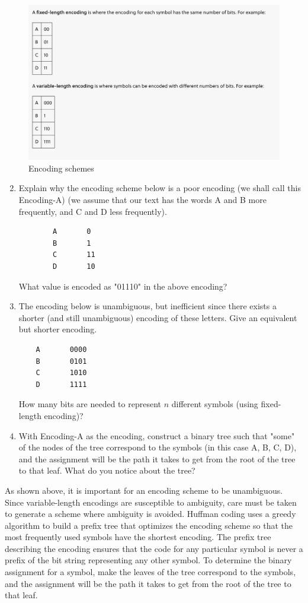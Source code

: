 \documentclass[11pt]{article}
\begin{document}
\begin{figure}[h!]
	\centering
	\label{fig:encoding-1}
	\includegraphics[scale=0.5]{encoding-1.png}
	\caption{Encoding schemes}
\end{figure}

\begin{enumerate}\setcounter{enumi}{1}
	\item Explain why the encoding scheme below is a poor encoding (we shall call this Encoding-A) (we assume that our text has the words A and B more frequently, and C and D less frequently).
	\begin{verbatim}
		A		0
		B		1
		C		11
		D		10
	\end{verbatim}
What value is encoded as "01110" in the above encoding?

\item The encoding below is unambiguous, but inefficient since there exists a shorter (and still unambiguous) encoding of these letters. Give an equivalent but shorter encoding.

	\begin{verbatim}
	A		0000			
	B		0101
	C		1010
	D		1111
\end{verbatim}
How many bits are needed to represent $n$ different symbols (using fixed-length encoding)?

\item With Encoding-A as the encoding, construct a binary tree such that "some" of the nodes of the tree correspond to the symbols (in this case A, B, C, D), and the assignment will be the path it takes to get from the root of the tree to that leaf.
What do you notice about the tree?

\end{enumerate}

As shown above, it is important for an encoding scheme to be unambiguous. Since variable-length encodings are susceptible to ambiguity, care must be taken to generate a scheme where ambiguity is avoided. Huffman coding uses a greedy algorithm to build a prefix tree that optimizes the encoding scheme so that the most frequently used symbols have the shortest encoding. The prefix tree describing the encoding ensures that the code for any particular symbol is never a prefix of the bit string representing any other symbol. To determine the binary assignment for a symbol, make the leaves of the tree correspond to the symbols, and the assignment will be the path it takes to get from the root of the tree to that leaf.
\end{document}

